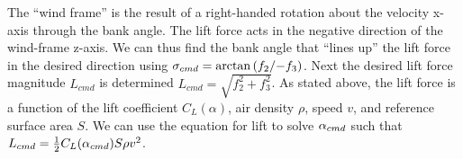 \documentclass{UnderReview}
\begin{document}
The ``wind frame'' is the result of a right-handed rotation about the velocity x-axis through the bank angle. 
The lift force acts in the negative direction of the wind-frame z-axis. 
We can thus find the bank angle that ``lines up'' the lift force in the desired direction using $\sigma_{cmd} = \arctan \left({f_2}/{-f_3}\right)$.
%
\def \liftCmd {L_{cmd}}
%
Next the desired lift force magnitude $ \liftCmd $ is determined $\liftCmd=\sqrt{f_2^2 + f_3^2}$.
%
\def \cLift {C_{L}}
\def \sRef {S}
%
As stated above, the lift force is a function of the lift coefficient $ \cLift(\alpha) $, air density $ \rho $, speed $ v $, and reference surface area $ \sRef $.
We can use the equation for lift to solve $ \alpha_{cmd}  $ such that $\liftCmd = \frac{1}{2}\cLift(\alphaCmd) \sRef \rho v^2$.   
\end{document}
